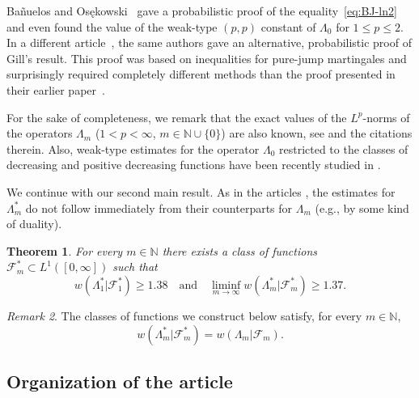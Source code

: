 \documentclass[a4paper]{amsart} %
\newtheorem{theorem}{Theorem}[section]
\theoremstyle{definition}
\theoremstyle{remark}
\newtheorem{remark}[theorem]{Remark}
\numberwithin{equation}{section}
\newcommand*{\NN}{\mathbb{N}}
\newcommand*{\NNzero}{\mathbb{N}\cup\{0\}}
\newcommand*{\NNone}{\mathbb{N}}
\newcommand*{\weakconstrestricted}[2]{w(#1|#2)} %
\newcommand*{\fclassspec}[1]{\mathcal{F}_{#1}}
\newcommand*{\fclassspecStar}[1]{\mathcal{F}_{#1}^*}
\begin{document}
Ba\~{n}uelos and Osękowski~\cite{MR3018958}
gave a probabilistic proof of the equality~\eqref{eq:BJ-ln2}
and even found 
the value of the weak-type $(p,p)$ constant of $\Lambda_0$ for $1\leq p \leq 2$.
In a different article~\cite{MR3189475},
 the same authors
gave an alternative, probabilistic proof of Gill's result.
This proof was based on inequalities for pure-jump martingales 
and surprisingly required completely different methods than the proof
presented in their earlier paper~\cite{MR3018958}.


For the sake of completeness, we remark that the exact values of the $L^p$-norms
of the operators $\Lambda_m$ ($1<p<\infty$, $m\in\NNzero$) 
are also known, see \cite{MR3558516} and the citations therein.
Also, weak-type estimates for the  operator $\Lambda_0$
restricted to the classes of decreasing 
and positive decreasing functions have been recently studied in \cite{MR3868629}.

We continue with our second main result.
As in the articles \cite{MR2677626,MR3189475},
the estimates for $\Lambda_m^*$ do not follow immediately
from their counterparts for $\Lambda_m$
(e.g., by some kind of duality).

\begin{theorem}
	\label{thm:main-lower-bounds-star}
	For every $m\in\NN$ 
	there exists a class of functions $\fclassspecStar{m}\subset L^1([0,\infty])$ 
	such that
	\begin{equation*}
	\weakconstrestricted{\Lambda_1^*}{\fclassspecStar{1}}\geq 1.38
	\quad \text{and} \quad
	\liminf_{m\to \infty} \weakconstrestricted{\Lambda_m^*}{\fclassspecStar{m}} \geq 1.37.
	\end{equation*}
\end{theorem}

\begin{remark}
	\label{rem:W-vs-W-star}
	The classes of functions we construct below satisfy, 
	for every $m\in\NNone$,
	\begin{equation*}
	\weakconstrestricted{\Lambda_m^*}{\fclassspecStar{m}} 	
	= 		\weakconstrestricted{\Lambda_m}{\fclassspec{m}}.	
	\end{equation*}
\end{remark}

\subsection{Organization of the article}
\end{document}
